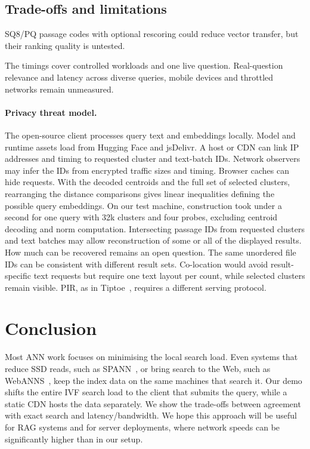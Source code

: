 \documentclass[sigconf, screen, review, balance=false]{acmart}
\begin{document}
\subsection{Trade-offs and limitations}
SQ8/PQ passage codes with optional rescoring could reduce vector transfer, but their ranking quality is untested.

The timings cover controlled workloads and one live question. Real-question relevance and latency across diverse queries, mobile devices and throttled networks remain unmeasured.

\paragraph{Privacy threat model.}
The open-source client processes query text and embeddings locally. Model and runtime assets load from Hugging Face and jsDelivr. A host or CDN can link IP addresses and timing to requested cluster and text-batch IDs. Network observers may infer the IDs from encrypted traffic sizes and timing. Browser caches can hide requests. With the decoded centroids and the full set of selected clusters, rearranging the distance comparisons gives linear inequalities defining the possible query embeddings. On our test machine, construction took under a second for one query with 32k clusters and four probes, excluding centroid decoding and norm computation. Intersecting passage IDs from requested clusters and text batches may allow reconstruction of some or all of the displayed results. How much can be recovered remains an open question. The same unordered file IDs can be consistent with different result sets. Co-location would avoid result-specific text requests but require one text layout per count, while selected clusters remain visible. PIR, as in Tiptoe~\cite{Tiptoe}, requires a different serving protocol.

\section{Conclusion}
Most ANN work focuses on minimising the local search load. Even systems that reduce SSD reads, such as SPANN~\cite{spann}, or bring search to the Web, such as WebANNS~\cite{WebANNS}, keep the index data on the same machines that search it. Our demo shifts the entire IVF search load to the client that submits the query, while a static CDN hosts the data separately. We show the trade-offs between agreement with exact search and latency/bandwidth. We hope this approach will be useful for RAG systems and for server deployments, where network speeds can be significantly higher than in our setup.
\end{document}
